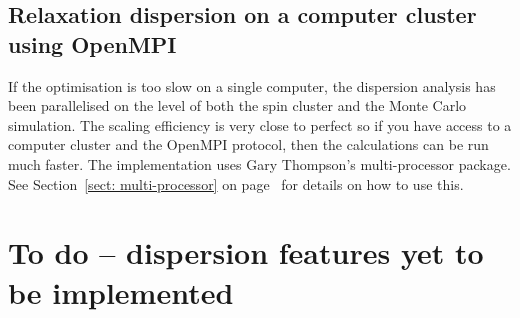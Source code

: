 
\subsection{Relaxation dispersion on a computer cluster using OpenMPI}
\label{sect: Relaxation dispersion using OpenMPI}

If the optimisation is too slow on a single computer, the dispersion analysis has been parallelised on the level of both the spin cluster and the Monte Carlo simulation.
The scaling efficiency is very close to perfect so if you have access to a computer cluster and the OpenMPI protocol, then the calculations can be run much faster.
The implementation uses Gary Thompson's multi-processor package.
See Section~\ref{sect: multi-processor} on page~\pageref{sect: multi-processor} for details on how to use this.




\section{To do -- dispersion features yet to be implemented}
\label{sect: dispersion: TODO}


